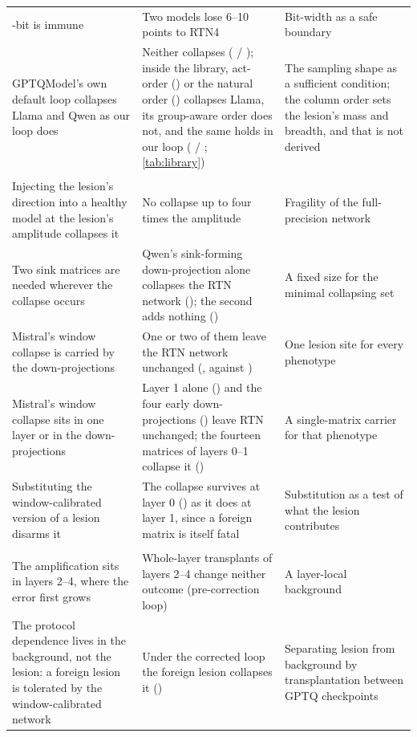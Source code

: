 \begin{center}
\begin{longtable}{>{\raggedright\arraybackslash}p{4.2cm}>{\raggedright\arraybackslash}p{5.2cm}>{\raggedright\arraybackslash}p{3.6cm}}
4-bit is immune & Two models lose 6--10 points to RTN4 & Bit-width as a safe boundary \\
GPTQModel's own default loop collapses Llama and Qwen as our loop does & Neither collapses (\LibLIF{} / \LibQIF{}); inside the library, act-order (\LibLdescIF{}) or the natural order (\LibLnogarIF{}) collapses Llama, its group-aware order does not, and the same holds in our loop (\GarLIF{} / \GarQIF{}; \cref{tab:library}) & The sampling shape as a sufficient condition; the column order sets the lesion's mass and breadth, and that is not derived \\
\addlinespace[3pt]\multicolumn{3}{l}{\emph{Where the lesion is and what it needs}} \\\addlinespace[1pt]
Injecting the lesion's direction into a healthy model at the lesion's amplitude collapses it & No collapse up to four times the amplitude & Fragility of the full-precision network \\
Two sink matrices are needed wherever the collapse occurs & Qwen's sink-forming down-projection alone collapses the RTN network (\QlesionRtnIF{}); the second adds nothing (\QpairRtnIF{}) & A fixed size for the minimal collapsing set \\
Mistral's window collapse is carried by the down-projections & One or two of them leave the RTN network unchanged (\MoneRtnIF{}, \MpairRtnIF{} against \MrtnIF{}) & One lesion site for every phenotype \\
Mistral's window collapse sits in one layer or in the down-projections & Layer 1 alone (\MlayerOneIF{}) and the four early down-projections (\MfourDownIF{}) leave RTN unchanged; the fourteen matrices of layers 0--1 collapse it (\MfourteenIF{}) & A single-matrix carrier for that phenotype \\
Substituting the window-calibrated version of a lesion disarms it & The collapse survives at layer 0 (\LcwinZeroSwapIF{}) as it does at layer 1, since a foreign matrix is itself fatal & Substitution as a test of what the lesion contributes \\
\addlinespace[3pt]\multicolumn{3}{l}{\emph{The background and its absorption}} \\\addlinespace[1pt]
The amplification sits in layers 2--4, where the error first grows & Whole-layer transplants of layers 2--4 change neither outcome (pre-correction loop) & A layer-local background \\
The protocol dependence lives in the background, not the lesion: a foreign lesion is tolerated by the window-calibrated network & Under the corrected loop the foreign lesion collapses it (\TPcwin{}) & Separating lesion from background by transplantation between GPTQ checkpoints \\

\end{longtable}
\end{center}
